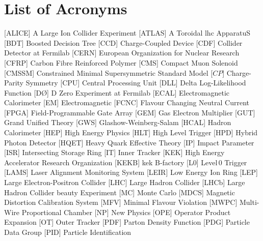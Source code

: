 
\chapter{List of Acronyms}

\renewcommand{\bflabel}[1]{{\textbf{#1}\hfill}} %

{\singlespace \boldmath

\begin{acronym}[AAAAAAA]
 [ALICE] {A Large Ion Collider Experiment}
 [ATLAS] {A Toroidal \acs{lhc} ApparatuS}
 [BDT] {Boosted Decision Tree}
 [CCD] {Charge-Coupled Device}
 [CDF] {Collider Detector at Fermilab}
 [CERN] {European Organization for Nuclear Research}
 [CFRP] {Carbon Fibre Reinforced Polymer}
 [CMS] {Compact Muon Solenoid}
 [CMSSM] {Constrained Minimal Supersymmetric Standard Model}
 [\ensuremath{C\!P}] {Charge-Parity Symmetry}
 [CPU] {Central Processing Unit}
 [DLL] {Delta Log-Likelihood Function}
 [D\O] {D Zero Experiment at Fermilab}
 [ECAL] {Electromagnetic Calorimeter}
 [EM] {Electromagnetic}
 [FCNC] {Flavour Changing Neutral Current}
 [FPGA] {Field-Programmable Gate Array}
 [GEM] {Gas Electron Multiplier}
 [GUT] {Grand Unified Theory}
 [GWS] {Glashow-Weinberg-Salam}
 [HCAL] {Hadron Calorimeter}
 [HEP] {High Energy Physics}
 [HLT] {High Level Trigger}
 [HPD] {Hybrid Photon Detector}
 [HQET] {Heavy Quark Effective Theory}
 [IP] {Impact Parameter}
 [ISR] {Intersecting Storage Ring}
 [IT] {Inner Tracker}
 [KEK] {High Energy Accelerator Research Organization}
 [KEKB] {\acs{kek} B-factory}
 [L0] {Level\,0 Trigger}
 [LAMS] {Laser Alignment Monitoring System}
 [LEIR] {Low Energy Ion Ring}
 [LEP] {Large Electron-Positron Collider}
 [LHC] {Large Hadron Collider}
 [LHCb] {Large Hadron Collider beauty Experiment}
 [MC] {Monte Carlo}
 [MDCS] {Magnetic Distortion Calibration System}
 [MFV] {Minimal Flavour Violation}
 [MWPC] {Multi-Wire Proportional Chamber}
 [NP] {New Physics}
 [OPE] {Operator Product Expansion}
 [OT] {Outer Tracker}
 [PDF] {Parton Density Function}
 [PDG] {Particle Data Group}
 [PID] {Particle Identification}

\end{acronym}}
